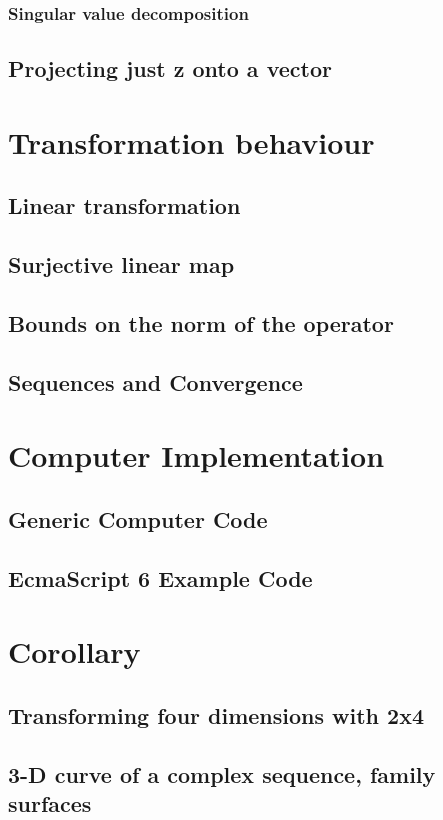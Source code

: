\documentclass[a4paper]{article}
\begin{document}
\subsubsection{Singular value decomposition} 
\subsection{Projecting just z onto a vector}

\section{Transformation behaviour}
\subsection{Linear transformation}
\subsection{Surjective linear map}
\subsection{Bounds on the norm of the operator}
\subsection{Sequences and Convergence}

\section{Computer Implementation}
\subsection{Generic Computer Code}
\subsection{EcmaScript 6 Example Code}


\section{Corollary}
\subsection{Transforming four dimensions with 2x4}
\subsection{3-D curve of a complex sequence, family surfaces}
\end{document}
